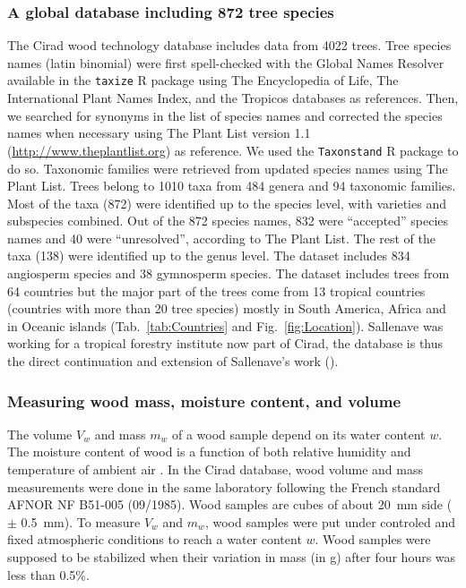 \documentclass[a4paper, 12pt, leqno, dvipsnames]{article}\usepackage[]{graphicx}\usepackage[]{color}
\begin{document}
\subsubsection{A global database including 872 tree species}

The Cirad wood technology database includes data from 4022 trees. Tree species names (latin binomial) were first spell-checked with the Global Names Resolver available in the \texttt{taxize} R package \citep{Chamberlain2013} using The Encyclopedia of Life, The International Plant Names Index, and the Tropicos databases as references. Then, we searched for synonyms in the list of species names and corrected the species names when necessary using The Plant List version 1.1 (\url{http://www.theplantlist.org}) as reference. We used the \texttt{Taxonstand} R package \citep{Cayuela2017} to do so. Taxonomic families were retrieved from updated species names using The Plant List. Trees belong to 1010 taxa from 484 genera and 94 taxonomic families. Most of the taxa (872) were identified up to the species level, with varieties and subspecies combined. Out of the 872 species names, 832 were ``accepted'' species names and 40 were ``unresolved'', according to The Plant List. The rest of the taxa (138) were identified up to the genus level. The dataset includes 834 angiosperm species and 38 gymnosperm species. The dataset includes trees from 64 countries but the major part of the trees come from 13 tropical countries (countries with more than 20 tree species) mostly in South America, Africa and in Oceanic islands (Tab.~\ref{tab:Countries} and Fig.~\ref{fig:Location}). Sallenave was working for a tropical forestry institute now part of Cirad, the database is thus the direct continuation and extension of Sallenave's work (\citeyear{Sallenave1955, Sallenave1964, Sallenave1971}).

\subsubsection{Measuring wood mass, moisture content, and volume}
\label{seq:mass-volume}

The volume $V_w$ and mass $m_w$ of a wood sample depend on its water content $w$. The moisture content of wood is a function of both relative humidity and temperature of ambient air \citep{Hailwood1946, Glass2010}. In the Cirad database, wood volume and mass measurements were done in the same laboratory following the French standard AFNOR NF B51-005 (09/1985). Wood samples are cubes of about 20~mm side ($\pm$ 0.5~mm). To measure $V_w$ and $m_w$, wood samples were put under controled and fixed atmospheric conditions to reach a water content $w$. Wood samples were supposed to be stabilized when their variation in mass (in g) after four hours was less than 0.5\%.
\end{document}
